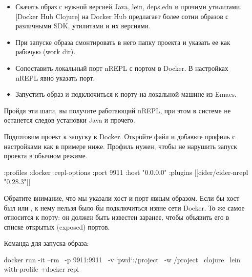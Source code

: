 \begin{itemize}

\item
  Скачать образ с нужной версией Java, lein, deps.edn и прочими утилитами. [Docker Hub Clojure] на Docker Hub предлагает более сотни образов с различными SDK, утилитами и их версиями.

\item
  При запуске образа смонтировать в него папку проекта и указать ее как рабочую (work dir).

\item
  Сопоставить локальный порт nREPL с портом в Docker. В настройках nREPL явно указать порт.

\item
  Запустить образ и подключиться к порту на локальной машине из Emacs.

\end{itemize}

Пройдя эти шаги, вы получите работающий nREPL, при этом в системе не останется следов установки Java и прочего.

Подготовим проект к запуску в Docker. Откройте файл  и добавьте профиль  с настройками как в примере ниже. Профиль нужен, чтобы не нарушить запуск проекта в обычном режиме.

\begin{english}
  \begin{clojure}
:profiles
{:docker
 {:repl-options
   {:port 9911
    :host "0.0.0.0"}
  :plugins [[cider/cider-nrepl "0.28.3"]]}}
  \end{clojure}
\end{english}

Обратите внимание, что мы указали хост и порт явным образом. Если бы хост был  или , к нему нельзя было бы подключиться извне сети Docker. То же самое относится к порту: он должен быть известен заранее, чтобы объявить его в списке открытых (exposed) портов.

Команда для запуска образа:

\begin{english}
  \begin{bash/lines}
docker run -it --rm \
  -p 9911:9911 \
  -v `pwd`:/project \
  -w /project \
  clojure \
  lein with-profile +docker repl
  \end{bash/lines}
\end{english}

